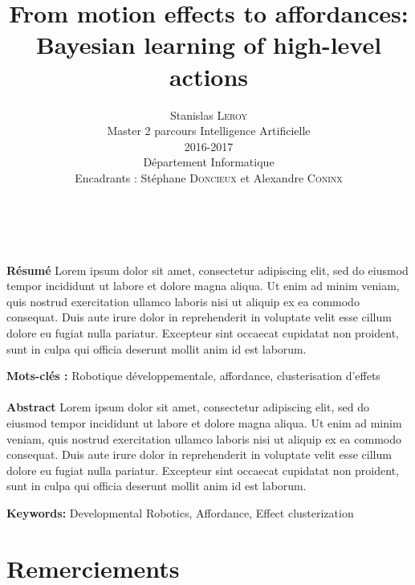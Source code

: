 \documentclass[draft]{llncs}
\begin{document}
\title{From motion effects to affordances: Bayesian learning of high-level actions}

\author{Stanislas \textsc{Leroy}\\
   Master 2 parcours Intelligence Artificielle\\
   2016-2017\\
   Département Informatique\\
   Encadrants : Stéphane \textsc{Doncieux} et Alexandre \textsc{Coninx}}


\maketitle

\ \\\\\textbf{Résumé} Lorem ipsum dolor sit amet, consectetur adipiscing elit, sed do eiusmod tempor incididunt ut labore et dolore magna aliqua. Ut enim ad minim veniam, quis nostrud exercitation ullamco laboris nisi ut aliquip ex ea commodo consequat. Duis aute irure dolor in reprehenderit in voluptate velit esse cillum dolore eu fugiat nulla pariatur. Excepteur sint occaecat cupidatat non proident, sunt in culpa qui officia deserunt mollit anim id est laborum.

\textbf{Mots-clés :} Robotique développementale, affordance, clusterisation d'effets\\\\



\textbf{Abstract} Lorem ipsum dolor sit amet, consectetur adipiscing elit, sed do eiusmod tempor incididunt ut labore et dolore magna aliqua. Ut enim ad minim veniam, quis nostrud exercitation ullamco laboris nisi ut aliquip ex ea commodo consequat. Duis aute irure dolor in reprehenderit in voluptate velit esse cillum dolore eu fugiat nulla pariatur. Excepteur sint occaecat cupidatat non proident, sunt in culpa qui officia deserunt mollit anim id est laborum.

\textbf{Keywords:} Developmental Robotics, Affordance, Effect clusterization






\section*{Remerciements}
\end{document}
